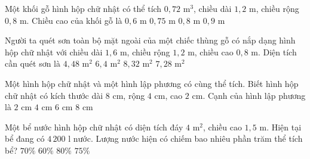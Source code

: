 \begin{ex} %
Một khối gỗ hình hộp chữ nhật có thể tích $0{,}72\text{ m}^3$, chiều dài $1{,}2\text{ m}$, chiều rộng $0{,}8\text{ m}$. Chiều cao của khối gỗ là
\choice
{$0{,}6\text{ m}$}
{\True $0{,}75\text{ m}$}
{$0{,}8\text{ m}$}
{$0{,}9\text{ m}$}
\end{ex}

\begin{ex} %
Người ta quét sơn toàn bộ mặt ngoài của một chiếc thùng gỗ có nắp dạng hình hộp chữ nhật với chiều dài $1{,}6\text{ m}$, chiều rộng $1{,}2\text{ m}$, chiều cao $0{,}8\text{ m}$. Diện tích cần quét sơn là
\choice
{$4{,}48\text{ m}^2$}
{$6{,}4\text{ m}^2$}
{\True $8{,}32\text{ m}^2$}
{$7{,}28\text{ m}^2$}
\end{ex}

\begin{ex} %
Một hình hộp chữ nhật và một hình lập phương có cùng thể tích. Biết hình hộp chữ nhật có kích thước dài $8\text{ cm}$, rộng $4\text{ cm}$, cao $2\text{ cm}$. Cạnh của hình lập phương là
\choice
{$2\text{ cm}$}
{\True $4\text{ cm}$}
{$6\text{ cm}$}
{$8\text{ cm}$}
\end{ex}

\begin{ex} %
Một bể nước hình hộp chữ nhật có diện tích đáy $4\text{ m}^2$, chiều cao $1{,}5\text{ m}$. Hiện tại bể đang có $4\,200\text{ l}$ nước. Lượng nước hiện có chiếm bao nhiêu phần trăm thể tích bể?
\choice
{\True $70\%$}
{$60\%$}
{$80\%$}
{$75\%$}
\end{ex}

